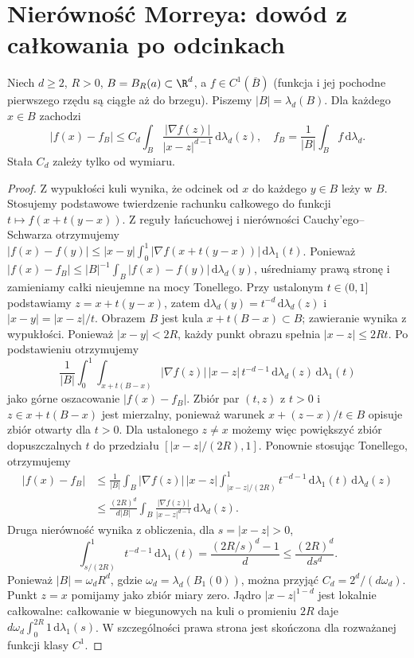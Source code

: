 \section{Nierówność Morreya: dowód z całkowania po odcinkach}
\label{sec:pde10-Morrey}

\begin{lemat}
\label{lem:pde10-point-average}
Niech $d\ge2$, $R>0$, $B=B_R(a)\subset\R^d$,
a $f\in C^1(\overline B)$ (funkcja i jej pochodne
pierwszego rzędu są ciągłe aż do brzegu).
Piszemy $|B|=\lambda_d(B)$.
Dla każdego $x\in B$ zachodzi
\[
 |f(x)-f_B|\le C_d\int_B
 \frac{|\nabla f(z)|}{|x-z|^{d-1}}\,\mathrm d\lambda_d(z),
 \quad f_B=\frac{1}{|B|}\int_Bf\,\mathrm d\lambda_d.
\]
Stała $C_d$ zależy tylko od wymiaru.
\end{lemat}
\begin{proof}
Z wypukłości kuli wynika, że odcinek od $x$ do każdego
$y\in B$ leży w $B$. Stosujemy podstawowe twierdzenie
rachunku całkowego do funkcji $t\mapsto f(x+t(y-x))$.
Z reguły łańcuchowej i nierówności Cauchy'ego--Schwarza
otrzymujemy
$|f(x)-f(y)|\le|x-y|\int_0^1
|\nabla f(x+t(y-x))|\,\mathrm d\lambda_1(t)$.
Ponieważ
$|f(x)-f_B|\le |B|^{-1}\int_B|f(x)-f(y)|\,\mathrm d\lambda_d(y)$,
uśredniamy prawą stronę i zamieniamy całki nieujemne
na mocy Tonellego. Przy ustalonym $t\in(0,1]$ podstawiamy
$z=x+t(y-x)$, zatem $\mathrm d\lambda_d(y)=
t^{-d}\,\mathrm d\lambda_d(z)$ i
$|x-y|=|x-z|/t$. Obrazem $B$ jest kula
$x+t(B-x)\subset B$; zawieranie wynika z wypukłości.
Ponieważ $|x-y|<2R$, każdy punkt obrazu spełnia
$|x-z|\le2Rt$. Po podstawieniu otrzymujemy
\[
 \frac1{|B|}\int_0^1\int_{x+t(B-x)}
 |\nabla f(z)|\,|x-z|\,t^{-d-1}
 \,\mathrm d\lambda_d(z)\,\mathrm d\lambda_1(t)
\]
jako górne oszacowanie $|f(x)-f_B|$.
Zbiór par $(t,z)$ z $t>0$ i $z\in x+t(B-x)$
jest mierzalny, ponieważ warunek
$x+(z-x)/t\in B$ opisuje zbiór otwarty dla $t>0$. Dla ustalonego $z\ne x$ możemy więc
powiększyć zbiór dopuszczalnych $t$ do przedziału
$[|x-z|/(2R),1]$. Ponownie stosując Tonellego,
otrzymujemy
\begin{align*}
 |f(x)-f_B|
 &\le\frac1{|B|}\int_B|\nabla f(z)|\,|x-z|
 \int_{|x-z|/(2R)}^1 t^{-d-1}\,\mathrm d\lambda_1(t)
 \,\mathrm d\lambda_d(z)\\
 &\le \frac{(2R)^d}{d|B|}
 \int_B\frac{|\nabla f(z)|}{|x-z|^{d-1}}
 \,\mathrm d\lambda_d(z).
\end{align*}
Druga nierówność wynika z obliczenia, dla $s=|x-z|>0$,
\[
 \int_{s/(2R)}^1 t^{-d-1}\,\mathrm d\lambda_1(t)
 =\frac{(2R/s)^d-1}{d}\le\frac{(2R)^d}{ds^d}.
\]
Ponieważ $|B|=\omega_dR^d$, gdzie
$\omega_d=\lambda_d(B_1(0))$, można przyjąć
$C_d=2^d/(d\omega_d)$. Punkt $z=x$ pomijamy jako zbiór
miary zero. Jądro $|x-z|^{1-d}$ jest lokalnie całkowalne:
całkowanie w biegunowych na kuli o promieniu $2R$
daje $d\omega_d\int_0^{2R}1\,\mathrm d\lambda_1(s)$.
W szczególności prawa strona jest skończona
dla rozważanej funkcji klasy $C^1$.
\end{proof}

